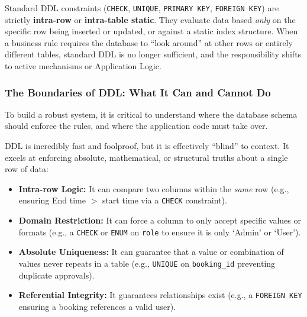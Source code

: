 Standard DDL constraints (\texttt{CHECK}, \texttt{UNIQUE}, \texttt{PRIMARY KEY}, \texttt{FOREIGN KEY}) are strictly \textbf{intra-row} or \textbf{intra-table static}. They evaluate data based \textit{only} on the specific row being inserted or updated, or against a static index structure. When a business rule requires the database to ``look around'' at other rows or entirely different tables, standard DDL is no longer sufficient, and the responsibility shifts to active mechanisms or Application Logic.

\subsubsection{The Boundaries of DDL: What It Can and Cannot Do}

To build a robust system, it is critical to understand where the database schema should enforce the rules, and where the application code must take over.

DDL is incredibly fast and foolproof, but it is effectively ``blind'' to context. It excels at enforcing absolute, mathematical, or structural truths about a single row of data:
\begin{itemize}
	\item \textbf{Intra-row Logic:} It can compare two columns within the \textit{same} row (e.g., ensuring End time $>$ start time via a \texttt{CHECK} constraint).
	\item \textbf{Domain Restriction:} It can force a column to only accept specific values or formats (e.g., a \texttt{CHECK} or \texttt{ENUM} on \texttt{role} to ensure it is only `Admin' or `User').
	\item \textbf{Absolute Uniqueness:} It can guarantee that a value or combination of values never repeats in a table (e.g., \texttt{UNIQUE} on \texttt{booking\_id} preventing duplicate approvals).
	\item \textbf{Referential Integrity:} It guarantees relationships exist (e.g., a \texttt{FOREIGN KEY} ensuring a booking references a valid user).
\end{itemize}

